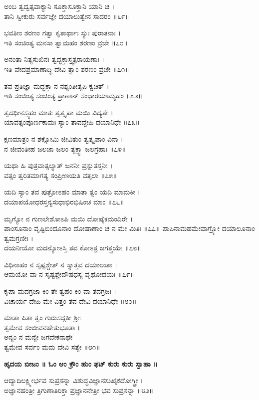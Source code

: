 	ಅಂಬ ತ್ವದ್ವತ್ಸವಾಕ್ಯಾನಿ ಸೂಕ್ತಾಸೂಕ್ತಾನಿ ಯಾನಿ ಚ ।\\
	ತಾನಿ ಸ್ವೀಕುರು ಸರ್ವಜ್ಞೇ ದಯಾಲುತ್ವೇನ ಸಾದರಂ ॥೬೯॥

ಭವತೀಂ ಶರಣಂ ಗತ್ವಾ ಕೃತಾರ್ಥಾಃ ಸ್ಯುಃ ಪುರಾತನಾಃ ।\\
ಇತಿ ಸಂಚಿಂತ್ಯ ಮನಸಾ ತ್ವಾಮಹಂ ಶರಣಂ ವ್ರಜೇ ॥೭೦॥

	ಅನಂತಾ ನಿತ್ಯಸುಖಿನಃ ತ್ವದ್ಭಕ್ತಾಸ್ತ್ವತ್ಪರಾಯಣಾಃ ।\\
	ಇತಿ ವೇದಪ್ರಮಾಣಾದ್ಧಿ ದೇವಿ ತ್ವಾಂ ಶರಣಂ ವ್ರಜೇ ॥೭೧॥

ತವ ಪ್ರತಿಜ್ಞಾ ಮದ್ಭಕ್ತಾ ನ ನಶ್ಯಂತೀತ್ಯಪಿ ಕ್ವಚಿತ್ ।\\
ಇತಿ ಸಂಚಿಂತ್ಯ ಸಂಚಿಂತ್ಯ ಪ್ರಾಣಾನ್ ಸಂಧಾರಯಾಮ್ಯಹಂ ॥೭೨॥

	ತ್ವದಧೀನಸ್ತ್ವಹಂ ಮಾತಃ ತ್ವತ್ಕೃಪಾ ಮಯಿ ವಿದ್ಯತೇ ।\\
	ಯಾವತ್ಸಂಪೂರ್ಣಕಾಮಃ ಸ್ಯಾಂ ತಾವದ್ದೇಹಿ ದಯಾನಿಧೇ ॥೭೩॥

ಕ್ಷಣಮಾತ್ರಂ ನ ಶಕ್ನೋಮಿ ಜೀವಿತುಂ ತ್ವತ್ಕೃಪಾಂ ವಿನಾ ।\\
ನ ಜೀವಂತೀಹ ಜಲಜಾ ಜಲಂ ತ್ಯಕ್ತ್ವಾ ಜಲಗ್ರಹಾಃ ॥೭೪॥

	ಯಥಾ ಹಿ ಪುತ್ರವಾತ್ಸಲ್ಯಾತ್ ಜನನೀ ಪ್ರಸ್ನುತಸ್ತನೀ ।\\
	ವತ್ಸಂ ತ್ವರಿತಮಾಗತ್ಯ ಸಂಪ್ರೀಣಯತಿ ವತ್ಸಲಾ ॥೭೫॥

ಯದಿ ಸ್ಯಾಂ ತವ ಪುತ್ರೋಽಹಂ ಮಾತಾ ತ್ವಂ ಯದಿ ಮಾಮಕೀ ।\\
ದಯಾಪಯೋಧರಸ್ತನ್ಯಸುಧಾಭಿರಭಿಷಿಂಚ ಮಾಂ ॥೭೬॥

	ಮೃಗ್ಯೋ ನ ಗುಣಲೇಶೋಽಪಿ ಮಯಿ ದೋಷೈಕಮಂದಿರೇ ।\\
	ಪಾಂಸೂನಾಂ ವೃಷ್ಟಿಬಿಂದೂನಾಂ ದೋಷಾಣಾಂ ಚ ನ ಮೇ ಮಿತಿಃ ॥೭೭॥
\newpage
ಪಾಪಿನಾಮಹಮೇವಾಗ್ರ್ಯೋ ದಯಾಲೂನಾಂ ತ್ವಮಗ್ರಣೀಃ ।\\
ದಯನೀಯೋ ಮದನ್ಯೋಽಸ್ತಿ ತವ ಕೋಽತ್ರ ಜಗತ್ತ್ರಯೇ ॥೭೮॥

	ವಿಧಿನಾಹಂ ನ ಸೃಷ್ಟಶ್ಚೇತ್ ನ ಸ್ಯಾತ್ತವ ದಯಾಲುತಾ ।\\
	ಆಮಯೋ ವಾ ನ ಸೃಷ್ಟಶ್ಚೇದೌಷಧಸ್ಯ ವೃಥೋದಯಃ ॥೭೯॥

ಕೃಪಾ ಮದಗ್ರಜಾ ಕಿಂ ತೇ ತ್ವಹಂ ಕಿಂ ವಾ ತದಗ್ರಜಃ ।\\
ವಿಚಾರ್ಯ ದೇಹಿ ಮೇ ವಿತ್ತಂ ತವ ದೇವಿ ದಯಾನಿಧೇ ॥೮೦॥

	ಮಾತಾ ಪಿತಾ ತ್ವಂ ಗುರುಸದ್ಗತೀ ಶ್ರೀಃ\\ತ್ವಮೇವ ಸಂಜೀವನಹೇತುಭೂತಾ ।\\
	ಅನ್ಯಂ ನ ಮನ್ಯೇ ಜಗದೇಕನಾಥೇ\\ ತ್ವಮೇವ ಸರ್ವಂ ಮಮ ದೇವಿ ಸತ್ಯೇ ॥೮೧॥

{\bfseries  ಹೃದಯ ಬೀಜಂ ॥ ಓಂ ಆಂ ಕ್ರೌಂ ಹುಂ ಫಟ್ ಕುರು ಕುರು ಸ್ವಾಹಾ ॥}

ಆದ್ಯಾದಿಲಕ್ಷ್ಮೀರ್ಭವ ಸುಪ್ರಸನ್ನಾ ವಿಶುದ್ಧವಿಜ್ಞಾನಸುಖೈಕದೋಗ್ಧ್ರೀ ।\\
ಅಜ್ಞಾನಹಂತ್ರೀ ತ್ರಿಗುಣಾತಿರಿಕ್ತಾ ಪ್ರಜ್ಞಾನನೇತ್ರೀ ಭವ ಸುಪ್ರಸನ್ನಾ ॥೮೨॥

